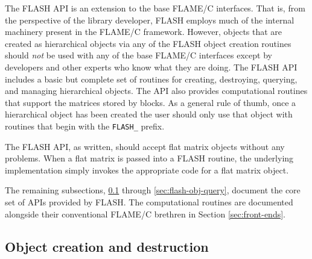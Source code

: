 The FLASH API is an extension to the base FLAME/C interfaces.
That is, from the perspective of the library developer, FLASH employs much
of the internal machinery present in the FLAME/C framework.
However, objects that are created as hierarchical objects via any of the
FLASH object creation routines should {\em not} be used with any of the base
FLAME/C interfaces except by developers and other experts who know what they
are doing.
The FLASH API includes a basic but complete set of routines for creating,
destroying, querying, and managing hierarchical objects.
The API also provides computational routines that support the matrices
stored by blocks.
As a general rule of thumb, once a hierarchical object has been created
the user should only use that object with routines that begin with the
{\tt FLASH\_} prefix.

The FLASH API, as written, should accept flat matrix objects without any
problems.
When a flat matrix is passed into a FLASH routine, the underlying implementation
simply invokes the appropriate code for a flat matrix object.

The remaining subsections, \ref{sec:flash-obj-creation} through
\ref{sec:flash-obj-query}, document the core set of APIs provided by
FLASH.
The computational routines are documented alongside their conventional
FLAME/C brethren in Section \ref{sec:front-ends}.


\subsection{Object creation and destruction}
\label{sec:flash-obj-creation}


